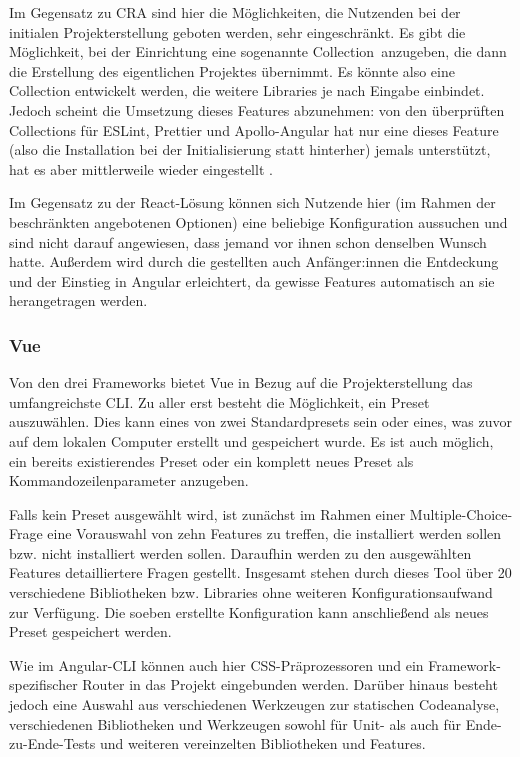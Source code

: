 Im Gegensatz zu CRA sind hier die Möglichkeiten, die Nutzenden bei der initialen Projekterstellung geboten werden, sehr eingeschränkt. Es gibt die Möglichkeit, bei der Einrichtung eine sogenannte \glqq Collection\grqq\ anzugeben, die dann die Erstellung des eigentlichen Projektes übernimmt. Es könnte also eine Collection entwickelt werden, die weitere Libraries je nach Eingabe einbindet. Jedoch scheint die Umsetzung dieses Features abzunehmen: von den überprüften Collections für ESLint, Prettier und Apollo-Angular hat nur eine dieses Feature (also die Installation bei der Initialisierung statt hinterher) jemals unterstützt, hat es aber mittlerweile wieder eingestellt \cite{angular_eslint_collection_issue} \cite{prettier_angular_collection_file} \cite{apollo_angular_collection_file}.

Im Gegensatz zu der React-Lösung können sich Nutzende hier (im Rahmen der beschränkten angebotenen Optionen) eine beliebige Konfiguration aussuchen und sind nicht darauf angewiesen, dass jemand vor ihnen schon denselben Wunsch hatte. Außerdem wird durch die gestellten auch Anfänger:innen die Entdeckung und der Einstieg in Angular erleichtert, da gewisse Features automatisch an sie herangetragen werden.


\subsubsection{Vue}
Von den drei Frameworks bietet Vue in Bezug auf die Projekterstellung das umfangreichste CLI. Zu aller erst besteht die Möglichkeit, ein Preset auszuwählen. Dies kann eines von zwei Standardpresets sein oder eines, was zuvor auf dem lokalen Computer erstellt und gespeichert wurde. Es ist auch möglich, ein bereits existierendes Preset oder ein komplett neues Preset als Kommandozeilenparameter anzugeben.

Falls kein Preset ausgewählt wird, ist zunächst im Rahmen einer Multiple-Choice-Frage eine Vorauswahl von zehn Features zu treffen, die installiert werden sollen bzw. nicht installiert werden sollen. Daraufhin werden zu den ausgewählten Features detailliertere Fragen gestellt. Insgesamt stehen durch dieses Tool über 20 verschiedene Bibliotheken bzw. Libraries ohne weiteren Konfigurationsaufwand zur Verfügung. Die soeben erstellte Konfiguration kann anschließend als neues Preset gespeichert werden.

Wie im Angular-\gls{CLI} können auch hier CSS-Präprozessoren und ein Framework-spezifischer Router in das Projekt eingebunden werden. Darüber hinaus besteht jedoch eine Auswahl aus verschiedenen Werkzeugen zur statischen Codeanalyse, verschiedenen Bibliotheken und Werkzeugen sowohl für Unit- als auch für Ende-zu-Ende-Tests und weiteren vereinzelten Bibliotheken und Features.

